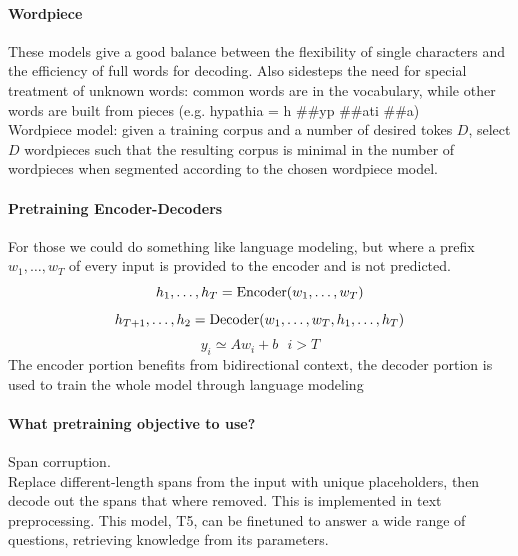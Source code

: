 \documentclass[10pt]{report}
\begin{document}
\paragraph{Wordpiece} These models give a good balance between the flexibility of single characters and the efficiency of full words for decoding. Also sidesteps the need for special treatment of unknown words: common words are in the vocabulary, while other words are built from pieces (e.g. hypathia = h \#\#yp \#\#ati \#\#a)\\
Wordpiece model: given a training corpus and a number of desired tokes $D$, select $D$ wordpieces such that the resulting corpus is minimal in the number of wordpieces when segmented according to the chosen wordpiece model.
\paragraph{Pretraining Encoder-Decoders} For those we could do something like language modeling, but where a prefix $w_1,\ldots,w_T$ of every input is provided to the encoder and is not predicted.
$$h_1,\ldots,h_T = \hbox{Encoder}(w_1,\ldots,w_T)$$
$$h_{T+1},\ldots,h_2 = \hbox{Decoder}(w_1,\ldots,w_T,h_1,\ldots,h_T)$$
$$y_i\simeq Aw_i+b\:\:\:i>T$$
The encoder portion benefits from bidirectional context, the decoder portion is used to train the whole model through language modeling
\paragraph{What pretraining objective to use?} Span corruption.\\
Replace different-length spans from the input with unique placeholders, then decode out the spans that where removed. This is implemented in text preprocessing. This model, T5, can be finetuned to answer a wide range of questions, retrieving knowledge from its parameters.
\end{document}
